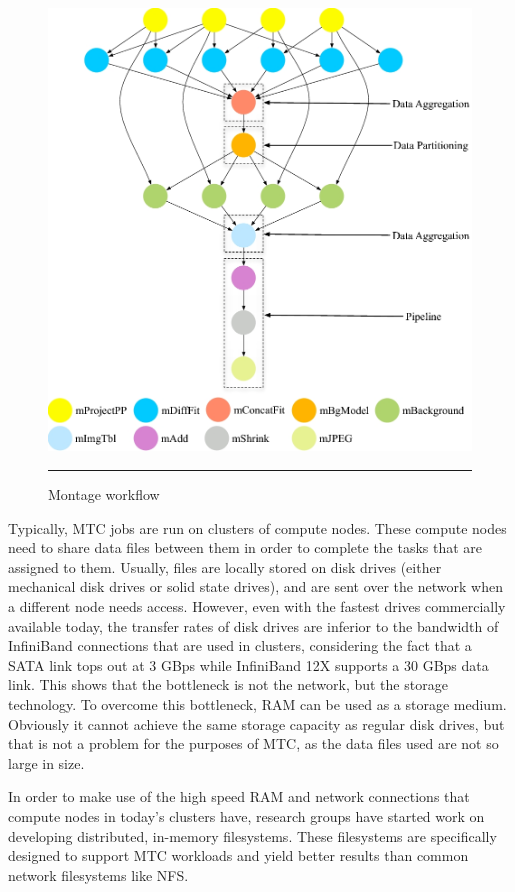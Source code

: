 \begin{figure}[H]
  \centering
    \includegraphics[scale=0.35]{Figures/montage.jpg}
    \rule{25em}{0.5pt}
  \caption[Montage workflow]{Montage workflow}
  \label{fig:montage}
\end{figure}

Typically, MTC jobs are run on clusters of compute nodes. These compute nodes need to share data files between them in order to complete the tasks that are assigned to them. Usually, files are locally stored on disk drives (either mechanical disk drives or solid state drives), and are sent over the network when a different node needs access. However, even with the fastest drives commercially available today, the transfer rates of disk drives are inferior to the bandwidth of InfiniBand connections that are used in clusters, considering the fact that a SATA link tops out at 3 GBps while InfiniBand 12X supports a 30 GBps data link. This shows that the bottleneck is not the network, but the storage technology. To overcome this bottleneck, RAM can be used as a storage medium. Obviously it cannot achieve the same storage capacity as regular disk drives, but that is not a problem for the purposes of MTC, as the data files used are not so large in size.

In order to make use of the high speed RAM and network connections that compute nodes in today's clusters have, research groups have started work on developing distributed, in-memory filesystems. These filesystems are specifically designed to support MTC workloads and yield better results than common network filesystems like NFS.

